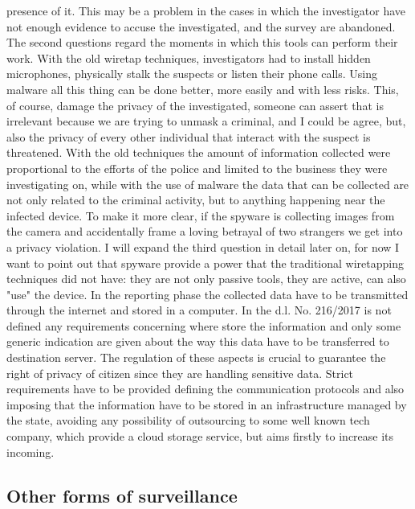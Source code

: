 presence of it. This may be a problem in the cases in which the investigator have not enough evidence to accuse the investigated, and the survey are abandoned. The second questions regard the moments in which this tools can perform their work. With the old wiretap techniques, investigators had to install hidden microphones, physically stalk the suspects or listen their phone calls. Using malware all this thing can be done better, more easily and with less risks. This, of course, damage the privacy of the investigated, someone can assert that is irrelevant because we are trying to unmask a criminal, and I could be agree, but, also the privacy of every other individual that interact with the suspect is threatened. With the old techniques the amount of information collected were proportional to the efforts of the police and limited to the business they were investigating on, while with the use of malware the data that can be collected are not only related to the criminal activity, but to anything happening near the infected device. To make it more clear, if the spyware is collecting images from the camera and accidentally frame a loving betrayal of two strangers we get into a privacy violation. I will expand the third question in detail later on, for now I want to point out that spyware provide a power that the traditional wiretapping techniques did not have: they are not only passive tools, they are active, can also "use" the device. In the reporting phase the collected data have to be transmitted through the internet and stored in a computer. In the d.l. No. 216/2017 is not defined any requirements concerning where store the information and only some generic indication are given about the way this data have to be transferred to destination server\cite{216/2021_reporting}. The regulation of these aspects is crucial to guarantee the right of privacy of citizen since they are handling sensitive data. Strict requirements have to be provided defining the communication protocols and also imposing that the information have to be stored in an infrastructure managed by the state, avoiding any possibility of outsourcing to some well known tech company, which provide a cloud storage service, but aims firstly to increase its incoming.

\subsection*{Other forms of surveillance}
